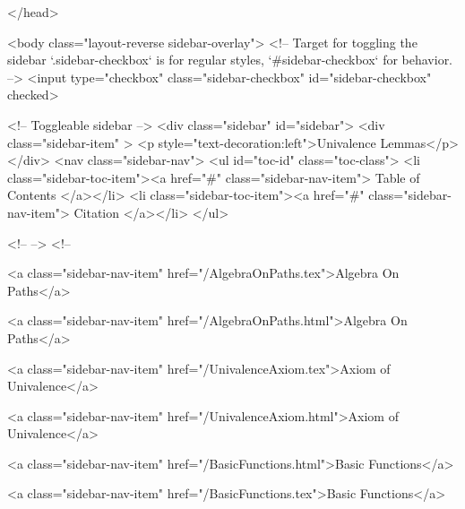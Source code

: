   
</head>




  <body class="layout-reverse sidebar-overlay">
    <!-- Target for toggling the sidebar `.sidebar-checkbox` is for regular
     styles, `#sidebar-checkbox` for behavior. -->
<input type="checkbox" class="sidebar-checkbox" id="sidebar-checkbox" checked>

<!-- Toggleable sidebar -->
<div class="sidebar" id="sidebar">
  <div class="sidebar-item" >
    <p style="text-decoration:left">Univalence Lemmas</p>
  </div>
  <nav class="sidebar-nav">
    <ul id="toc-id" class="toc-class">
  <li class="sidebar-toc-item"><a href="#" class="sidebar-nav-item"> Table of Contents </a></li>
  <li class="sidebar-toc-item"><a href="#" class="sidebar-nav-item"> Citation </a></li>
</ul>


    <!--  -->
    <!-- 
      
    
      
    
      
    
      
        
      
    
      
        
          <a class="sidebar-nav-item" href="/AlgebraOnPaths.tex">Algebra On Paths</a>
        
      
    
      
        
          <a class="sidebar-nav-item" href="/AlgebraOnPaths.html">Algebra On Paths</a>
        
      
    
      
        
          <a class="sidebar-nav-item" href="/UnivalenceAxiom.tex">Axiom of Univalence</a>
        
      
    
      
        
          <a class="sidebar-nav-item" href="/UnivalenceAxiom.html">Axiom of Univalence</a>
        
      
    
      
        
          <a class="sidebar-nav-item" href="/BasicFunctions.html">Basic Functions</a>
        
      
    
      
        
          <a class="sidebar-nav-item" href="/BasicFunctions.tex">Basic Functions</a>
        
      
    
